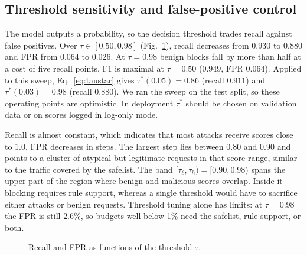 \documentclass[preprint,11pt]{elsarticle}
\let\footnotesize\normalsize
\begin{document}
\subsection{Threshold sensitivity and false-positive control}
The model outputs a probability, so the decision threshold trades recall
against false positives. Over $\tau\in[0.50,0.98]$
(Fig.~\ref{fig:threshold}), recall decreases from $0.930$ to $0.880$ and FPR
from $0.064$ to $0.026$. At $\tau=0.98$ benign blocks fall by more than half
at a cost of five recall points. F1 is maximal at $\tau=0.50$ ($0.949$, FPR
$0.064$). Applied to this sweep, Eq.~\eqref{eq:taustar} gives
$\tau^\ast(0.05)=0.86$ (recall $0.911$) and $\tau^\ast(0.03)=0.98$ (recall
$0.880$). We ran the sweep on the test split, so these operating points are
optimistic. In deployment $\tau^\ast$ should be chosen on validation data
or on scores logged in log-only mode.

Recall is almost constant, which indicates that most attacks receive scores
close to $1.0$. FPR decreases in steps. The largest step lies between
$0.80$ and $0.90$ and points to a cluster of atypical but legitimate
requests in that score range, similar to the traffic covered by the
safelist. The band $[\tau_\ell,\tau_h)=[0.90,0.98)$ spans the upper part of
the region where benign and malicious scores overlap. Inside it blocking
requires rule support, whereas a single threshold would have to sacrifice
either attacks or benign requests. Threshold tuning alone has limits: at
$\tau=0.98$ the FPR is still $2.6\%$, so budgets well below 1\% need the
safelist, rule support, or both.

\begin{figure}[t]
\centering
{}
\caption{Recall and FPR as functions of the threshold $\tau$.}
\label{fig:threshold}
\end{figure}
\end{document}
